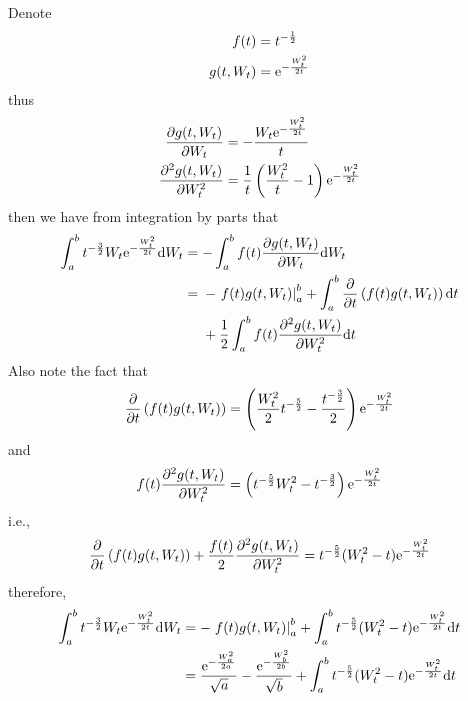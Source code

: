 \documentclass{homework}
\begin{document}
    \problem
    Denote
    \[\begin{aligned}
        f(t)&=t^{-\frac{1}{2}}\\
        g(t,W_t)&=\mathrm e^{-\frac{W_t^2}{2t}}
    \end{aligned}\]
    thus
    \[\begin{aligned}
        \frac{\partial g(t,W_t)}{\partial W_t}
        &=-\frac{W_t\mathrm e^{-\frac{W_t^2}{2t}}}{t}\\
        \frac{\partial^2 g(t,W_t)}{\partial W_t^2}
        &=\frac{1}{t}\left(\frac{W_t^2}{t}-1\right)\mathrm e^{-\frac{W_t^2}{2t}}
    \end{aligned}\]
    then we have from integration by parts that
    \[\begin{aligned}
        \int_a^bt^{-\frac{3}{2}}W_t\mathrm e^{-\frac{W_t^2}{2t}}\mathrm d W_t
        &=-\int_a^bf(t)\frac{\partial g(t,W_t)}{\partial W_t}\mathrm d W_t\\
        &=\begin{aligned}[t]
        &-\left.f(t)g(t,W_t)\right|_a^b
         +\int_a^b\frac{\partial}{\partial t}\left(f(t)g(t,W_t)\right)\mathrm d t\\
        &+\frac{1}{2}\int_a^bf(t)\frac{\partial^2g(t,W_t)}{\partial W_t^2}\mathrm d t
        \end{aligned}
    \end{aligned}\]
    Also note the fact that
    \[\frac{\partial}{\partial t}\left(f(t)g(t,W_t)\right)
    =\left(\frac{W_t^2}{2}t^{-\frac{5}{2}}-\frac{t^{-\frac{3}{2}}}{2}\right)
    \mathrm e^{-\frac{W_t^2}{2t}}\]
    and
    \[f(t)\frac{\partial^2g(t,W_t)}{\partial W_t^2}
    =\left(t^{-\frac{5}{2}}W_t^2-t^{-\frac{3}{2}}\right)\mathrm e^{-\frac{W_t^2}{2t}}\]
    i.e.,
    \[\frac{\partial}{\partial t}\left(f(t)g(t,W_t)\right)
    +\frac{f(t)}{2}\frac{\partial^2g(t,W_t)}{\partial W_t^2}
    =t^{-\frac{5}{2}}(W_t^2-t)\mathrm e^{-\frac{W_t^2}{2t}}\]
    therefore,
    \[\begin{aligned}
        \int_a^bt^{-\frac{3}{2}}W_t\mathrm e^{-\frac{W_t^2}{2t}}\mathrm d W_t
        &=-\left.f(t)g(t,W_t)\right|_a^b
        +\int_a^bt^{-\frac{5}{2}}(W_t^2-t)\mathrm e^{-\frac{W_t^2}{2t}}\mathrm d t\\
        &=\frac{\mathrm e^{-\frac{W_a^2}{2a}}}{\sqrt a}
        -\frac{\mathrm e^{-\frac{W_b^2}{2b}}}{\sqrt b}
        +\int_a^bt^{-\frac{5}{2}}(W_t^2-t)\mathrm e^{-\frac{W_t^2}{2t}}\mathrm d t\\
    \end{aligned}\]

    \appendix
\end{document}
